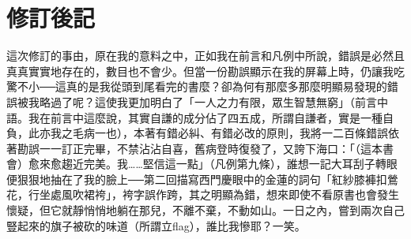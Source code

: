 \chapter*{修訂後記}

這次修訂的事由，原在我的意料之中，正如我在前言和凡例中所說，錯誤是必然且真真實實地存在的，數目也不會少。但當一份勘誤顯示在我的屏幕上時，仍讓我吃驚不小──這真的是我從頭到尾看完的書麼？卻為何有那麼多那麼明顯易發現的錯誤被我略過了呢？這使我更加明白了「一人之力有限，眾生智慧無窮」{\kaishu（前言中語。我在前言中這麼說，其實自謙的成分佔了四五成，所謂自謙者，實是一種自負，此亦我之毛病一也）}，本著有錯必糾、有錯必改的原則，我將一二百條錯誤依著勘誤一一訂正完畢，不禁沾沾自喜，舊病登時復發了，又誇下海口：「{\kaishu（這本書會）}愈來愈趨近完美。我……堅信這一點」{\kaishu（凡例第九條）}，誰想一記大耳刮子轉眼便狠狠地抽在了我的臉上──第二回描寫西門慶眼中的金蓮的詞句「紅紗膝褲扣鶯花，行坐處風吹裙袴」，袴字誤作跨，其之明顯為錯，想來即使不看原書也會發生懷疑，但它就靜悄悄地躺在那兒，不離不棄，不動如山。一日之內，嘗到兩次自己豎起來的旗子被砍的味道{\kaishu（所謂立flag）}，誰比我慘耶？一笑。

\begin{quotation}
\end{quotation}
